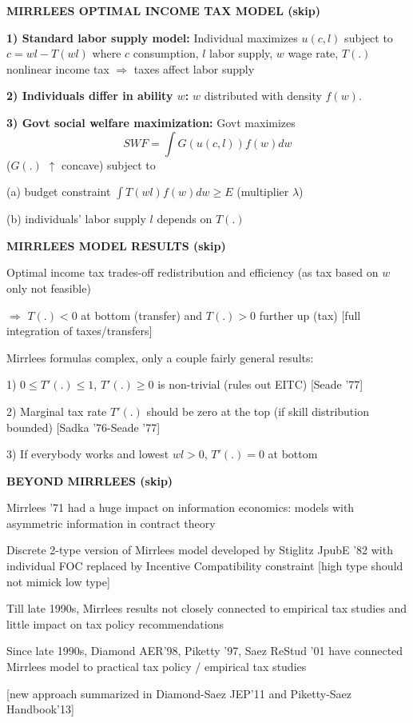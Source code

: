 \documentclass[landscape]{slides}
\begin{document}
\begin{slide}
\begin{center}
{\bf MIRRLEES OPTIMAL INCOME TAX MODEL (skip)}
\end{center}

{\bf 1) Standard labor supply model:} Individual maximizes
$u(c,l)$ subject to $c=wl-T(wl)$ where $c$ consumption, $l$ labor
supply, $w$ wage rate, $T(.)$ nonlinear income tax $\Rightarrow$
taxes affect labor supply

{\bf 2) Individuals differ in ability $w$:} $w$ distributed with
density $f(w)$.

{\bf 3) Govt social welfare maximization:} Govt maximizes
\[ SWF=\int G(u(c,l))f(w)dw\] ($G(.)$ $\uparrow$ concave) subject to

(a) budget constraint $\int T(wl) f(w)dw \geq E$ (multiplier
$\lambda$)

(b) individuals' labor supply $l$ depends on $T(.)$

\end{slide}

\begin{slide}
\begin{center}
{\bf MIRRLEES MODEL RESULTS (skip)}
\end{center}
Optimal income tax trades-off redistribution and efficiency (as
tax based on $w$ only not feasible) 

$\Rightarrow$ $T(.)<0$ at
bottom (transfer) and $T(.)>0$ further up (tax) [full integration
of taxes/transfers]

Mirrlees formulas complex, only a couple fairly general results:

1) $0 \leq T'(.) \leq 1$, $T'(.)\geq 0$ is non-trivial (rules out
EITC) [Seade '77]

2) Marginal tax rate $T'(.)$ should be zero at the top (if skill
distribution bounded) [Sadka '76-Seade '77]

3) If everybody works and lowest $wl>0$, $T'(.)=0$ at bottom


\end{slide}

\begin{slide}
\begin{center}
{\bf BEYOND MIRRLEES (skip)}
\end{center}
Mirrlees '71 had a huge impact on information economics:
models with asymmetric information in contract theory

Discrete 2-type version of Mirrlees model developed by Stiglitz
JpubE '82 with individual FOC replaced by Incentive Compatibility
constraint [high type should not mimick low type]

Till late 1990s, Mirrlees results not closely connected to
empirical tax studies and  little impact on tax policy
recommendations

Since late 1990s, Diamond AER'98, Piketty '97, Saez ReStud '01
have connected Mirrlees model to practical tax policy / empirical
tax studies 

[new approach summarized in Diamond-Saez JEP'11 and
Piketty-Saez Handbook'13]
\end{slide}
\end{document}
